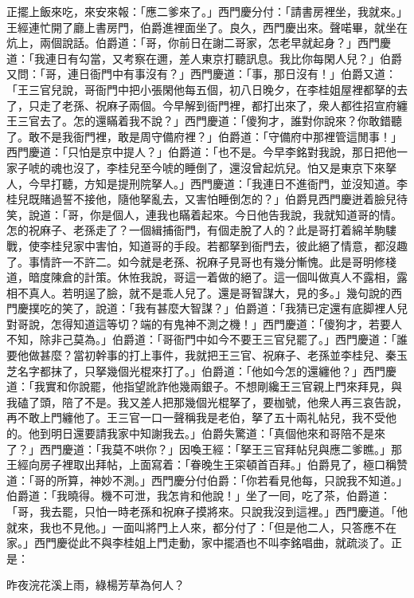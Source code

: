 正擺上飯來吃，來安來報：「應二爹來了。」西門慶分付：「請書房裡坐，我就來。」王經連忙開了廳上書房門，伯爵進裡面坐了。良久，西門慶出來。聲喏畢，就坐在炕上，兩個說話。伯爵道：「哥，你前日在謝二哥家，怎老早就起身？」西門慶道：「我連日有勾當，又考察在邇，差人東京打聽訊息。我比你每閑人兒？」伯爵又問：「哥，連日衙門中有事沒有？」西門慶道：「事，那日沒有！」伯爵又道：「王三官兒說，哥衙門中把小張閑他每五個，初八日晚夕，在李桂姐屋裡都拏的去了，只走了老孫、祝麻子兩個。今早解到衙門裡，都打出來了，衆人都徃招宣府纏王三官去了。怎的還瞞着我不說？」西門慶道：「傻狗才，誰對你說來？你敢錯聽了。敢不是我衙門裡，敢是周守備府裡？」{}伯爵道：「守備府中那裡管這閒事！」西門慶道：「只怕是京中提人？」伯爵道：「也不是。今早李銘對我說，那日把他一家子唬的魂也沒了，李桂兒至今唬的睡倒了，還沒曾起炕兒。怕又是東京下來拏人，今早打聽，方知是提刑院拏人。」西門慶道：「我連日不進衙門，並沒知道。李桂兒既賭過誓不接他，隨他拏亂去，又害怕睡倒怎的？」伯爵見西門慶迸着臉兒待笑，說道：「哥，你是個人，連我也瞞着起來。今日他告我說，我就知道哥的情。怎的祝麻子、老孫走了？一個緝捕衙門，有個走脫了人的？此是哥打着綿羊駒䮫戰，使李桂兒家中害怕，知道哥的手段。若都拏到衙門去，彼此絕了情意，都沒趣了。事情許一不許二。如今就是老孫、祝麻子見哥也有幾分慚愧。此是哥明修棧道，暗度陳倉的計策。休恠我說，哥這一着做的絕了。這一個叫做真人不露相，露相不真人。若明逞了臉，就不是乖人兒了。還是哥智謀大，見的多。」{}幾句說的西門慶撲吃的笑了，說道：「我有甚麼大智謀？」伯爵道：「我猜已定還有底脚裡人兒對哥說，怎得知道這等切？端的有鬼神不測之機！」西門慶道：「傻狗才，若要人不知，除非己莫為。」伯爵道：「哥衙門中如今不要王三官兒罷了。」西門慶道：「誰要他做甚麼？當初幹事的打上事件，我就把王三官、祝麻子、老孫並李桂兒、秦玉芝名字都抹了，只拏幾個光棍來打了。」伯爵道：「他如今怎的還纏他？」西門慶道：「我實和你說罷，他指望訛詐他幾兩銀子。不想剛纔王三官親上門來拜見，與我磕了頭，陪了不是。我又差人把那幾個光棍拏了，要枷號，他衆人再三哀告說，再不敢上門纏他了。王三官一口一聲稱我是老伯，{}拏了五十兩礼帖兒，我不受他的。他到明日還要請我家中知謝我去。」伯爵失驚道：「真個他來和哥陪不是來了？」西門慶道：「我莫不哄你？」因喚王經：「拏王三官拜帖兒與應二爹瞧。」那王經向房子裡取出拜帖，上面寫着：「眷晚生王寀頓首百拜。」伯爵見了，極口稱赞道：「哥的所算，神妙不測。」西門慶分付伯爵：「你若看見他每，只說我不知道。」伯爵道：「我曉得。機不可泄，我怎肯和他說！」坐了一囘，吃了茶，伯爵道：「哥，我去罷，只怕一時老孫和祝麻子摸將來。只說我沒到這裡。」西門慶道。「他就來，我也不見他。」{}一面叫將門上人來，都分付了：「但是他二人，只答應不在家。」西門慶從此不與李桂姐上門走動，家中擺酒也不叫李銘唱曲，就疏淡了。正是：

\begin{myquote} 
昨夜浣花溪上雨，綠楊芳草為何人？
\end{myquote} 

